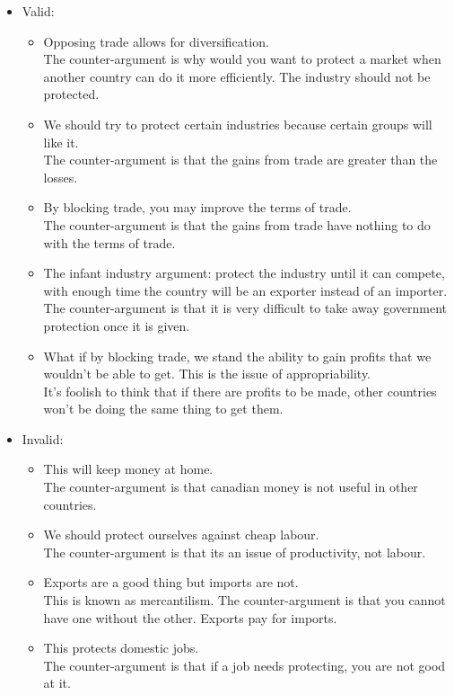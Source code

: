 \begin{itemize}
    \item Valid: 
    \begin{itemize}
        \item Opposing trade allows for diversification.\\
        The counter-argument is why would you want to protect a market when another country can do it more efficiently.
        The industry should not be protected.
        \item We should try to protect certain industries because certain groups will like it.\\
        The counter-argument is that the gains from trade are greater than the losses.
        \item By blocking trade, you may improve the terms of trade.\\
        The counter-argument is that the gains from trade have nothing to do with the terms of trade.
        \item The infant industry argument: protect the industry until it can compete, 
        with enough time the country will be an exporter instead of an importer.\\
        The counter-argument is that it is very difficult to take away government protection once it is given.
        \item What if by blocking trade, we stand the ability to gain profits that we wouldn't be able to get. This is the issue of appropriability.\\
        It's foolish to think that if there are profits to be made, other countries won't be doing the same thing to get them.
    \end{itemize}
    \item Invalid:
    \begin{itemize}
        \item This will keep money at home.\\
        The counter-argument is that canadian money is not useful in other countries.
        \item We should protect ourselves against cheap labour.\\
        The counter-argument is that its an issue of productivity, not labour.
        \item Exports are a good thing but imports are not.\\
        This is known as mercantilism. The counter-argument is that you cannot have one without the other. Exports pay for imports.
        \item This protects domestic jobs.\\
        The counter-argument is that if a job needs protecting, you are not good at it.
    \end{itemize}
\end{itemize}
